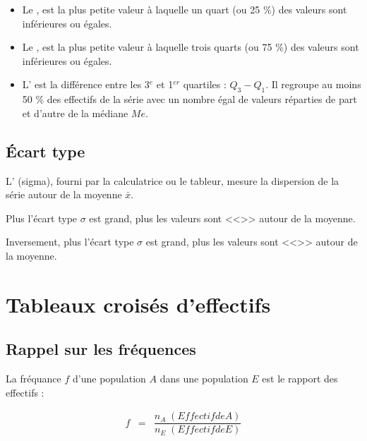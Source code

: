 \documentclass[12pt,a4paper]{article}
\begin{document}
\begin{mydef}
	\begin{itemize}
		\item Le , est la plus petite valeur à laquelle un quart (ou 25 \%) des valeurs sont inférieures ou égales.
		\item Le , est la plus petite valeur à laquelle trois quarts (ou 75 \%) des valeurs sont inférieures ou égales.
		\item L' est la différence entre les 3$^e$ et 1$^{er}$ quartiles : $Q_3 - Q_1$. Il regroupe au moins 50 \% des effectifs de la série avec un nombre égal de valeurs réparties de part et d'autre de la médiane $Me$.
	\end{itemize}
	
\end{mydef}	

\subsection{\'Ecart type}

\begin{mydef}
	L' (sigma), fourni par la calculatrice ou le tableur, mesure la dispersion de la série autour de la moyenne $\bar{x}$. 
	
	Plus l'écart type $\sigma$ est grand, plus les valeurs sont <<>> autour de la moyenne. 
	
	Inversement, plus l'écart type $\sigma$ est grand, plus les valeurs sont <<>> autour de la moyenne.
\end{mydef}	

\section{Tableaux croisés d'effectifs}


\subsection{Rappel sur les fréquences}

\begin{mydef}
	La fréquance $f$ d'une population $A$ dans une population $E$ est le rapport des effectifs :
	
	\begin{eqnarray*}
		f & = & \dfrac{n_A \; (Effectif de A) }{n_E \; (Effectif de E)}  \\
	\end{eqnarray*}
\end{mydef}
\end{document}
